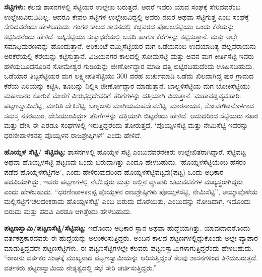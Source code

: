 \textbf{ಸೆಟ್ಟಿಗಳು:} ಕೆಲವು ಶಾಸನಗಳಲ್ಲಿ ಸೆಟ್ಟಿಯರ ಉಲ್ಲೇಖ ಬರುತ್ತದೆ. ಆದರೆ ಇವರು ಯಾವ ಸಂಘಕ್ಕೆ ಸೇರಿದವರೆಂಬ ಉಲ್ಲೇಖವಿರುವಿದಿಲ್ಲ. ಆದರೂ ಕೇವಲ ಸೆಟ್ಟಿಗಳ ಉಲ್ಲೇಖವಿದ್ದಲ್ಲಿ ಅವರು ನಖರ ಅಥವಾ ಸೆಟ್ಟಿಗುತ್ತ ಎಂಬ ಸಂಘಕ್ಕೆ ಸೇರಿದವರೆಂದು ಹೇಳಬಹುದು. ಗಂಗರ ಕಾಲದ ಶಾಸನದಲ್ಲಿ ಕಚ್ಛವರದ ಪೊೞಲಸೆಟ್ಟಿಯು ಒಂದು ಕೆರೆಯನ್ನು ಕಟ್ಟಿಸಿದನೆಂದು ಹೇಳಿದೆ. ಜಕ್ಕಿಸೆಟ್ಟಿಯು ಸುಕ್ಕುಧರೆಯಲ್ಲಿ ಬಸದಿ ಹಾಗೂ ಕೆರೆಗಳನ್ನು ಕಟ್ಟಿಸುತ್ತಾನೆ. ಮತ್ತು ಅಲ್ಲೇ ಸಮಾಧಿಮರಣವನ್ನು ಹೊಂದುತ್ತಾನೆ. ಅರಿಕುಂಟೆ ದಮ್ಮಿಸೆಟ್ಟಿಯರ ಮಗ ಒಡೆಯನಂಬಿ ಉದಯಾದಿತ್ಯ ಪಲ್ಲವರಾಯನು ಅರಕೆರೆಯಲ್ಲಿ ಕೆರೆಯನ್ನು ಕಟ್ಟಿಸುತ್ತಾನೆ. ವಿಜಯನಗರ ಕಾಲದಲ್ಲಿ ಸೋಮಸೆಟ್ಟಿ ಮತ್ತು ಅವನ ಮಗ ಕೀರ್ತಿಸೆಟ್ಟಿ ಇವರು ಹಳೆಯಬೂದನೂರಿನ ಸೋಮೇಶ್ವರ ಗುಡಿಯನ್ನು ಜೀರ್ಣೋದ್ಧಾರ ಮಾಡಿ ದತ್ತಿ ಬಿಟ್ಟಿರಬಹುದೆಂದು ಊಹಿಸಬಹುದು. ಒಡೆಯಾರ ತಿಬ್ಬಸೆಟ್ಟಿಯರ ಮಗ ಲಕ್ಷ್ಮೀಪತಿಸೆಟ್ಟಿಯು 300 ವರಹ ಖರ್ಚುಮಾಡಿ ಒಡೆದು ಖಿಲವಾಗಿದ್ದ ಪುರ ಗ್ರಾಮದ ಕೆರೆಯ ಏರಿಯನ್ನು ಕಟ್ಟಿಸಿ, ತೂಬನ್ನು ನಿಲ್ಲಿಸಿ ಜೀರ್ಣೋದ್ಧಾರ ಮಾಡುತ್ತಾನೆ. ಬಾಲ್ದಳಿಸೆಟ್ಟಿಯ ಮಗ ಬೋಕಿಸೆಟ್ಟಿಯು ಮಹಾಜನರ ಕೋರಿಕೆ ಮೇರೆಗೆ ವೀರಭದ್ರದೇವರಿಗೆ ತೆರಿಗೆಗಳನ್ನು ದತ್ತಿಯಾಗಿ ಬಿಡುತ್ತಾನೆ. ಮಹಾವಡ್ಡವ್ಯವಹಾರಿ. ಪಟ್ಟಣಸ್ವಾಮಿಸೆಟ್ಟಿ, ಮಾರಿತಿ ದೇಕಿಸೆಟ್ಟಿ, ಬಣ್ನಚಾರಿ ಮಾಗಿಯಮಹದೇವಸೆಟ್ಟಿ, ಮಾರನಾಯಕ, ಸೋವಗೌಡನೊಳಗಾದ ಸಮಸ್ತ ನಕರಮುಂ, ದೇಸಿಯುಂವಿರ್ದ್ದು ತೆರಿಗೆಗಳನ್ನು ದತ್ತಿಯಾಗಿ ಬಿಟ್ಟರೆಂದು ಹೇಳಿದೆ. ಆದುದರಿಂದ ಸೆಟ್ಟಿಯರು ನಖರ ಮತ್ತು ದೇಸಿ ಈ ಎರಡೂ ಸಂಘಗಳಲ್ಲಿ ಇರುತ್ತಿದ್ದರೆಂದು ತೋರುತ್ತದೆ. ‘ಪೊಯ್ಸಳಸೆಟ್ಟಿ ಮತ್ತು ನೇಮಿಸೆಟ್ಟಿ ಇವರನ್ನು ಧರಣೀಪಾಳಕನಪ್ಪ ಪೊಯ್ಸಳನ ರಾಜಶ್ರೇಷ್ಠಿಗಳ್​’ ಎಂದು ಹೇಳಿದೆ.

\textbf{ಹೊಯ್ಸಳ ಸೆಟ್ಟಿ/ ಸೆಟ್ಟಿವಟ್ಟ: } ಶಾಸನಗಳಲ್ಲಿ ಹೊಯ್ಸಳ ಸೆಟ್ಟಿ ಎಂಬುವವರನೇಕರು ಉಲ್ಲೇಖಿತರಾಗಿದ್ದಾರೆ. ಸೆಟ್ಟಿವಟ್ಟ ಅಥವಾ ಹೊಯ್ಸಳಸೆಟ್ಟಿ ಪಟ್ಟಣವು ಒಂದು ಬಿರುದಾಗಿತ್ತು ಎಂದೂ ಹೇಳಬಹುದು. ‘ಹೊಯ್ಸಳಸೆಟ್ಟಿಯೆಂಬ ಹೆಸರಂ ಪಡೆದ ಹೊಯ್ಸಳಸೆಟ್ಟಿಗೆಅ’, ಎಂದು ಹೇಳಿರುವುದರಿಂದ ಹೊಯ್ಸಳಸೆಟ್ಟಿವಟ್ಟವು(ಪಟ್ಟ) ಒಂದು ಅಧಿಕಾರ ಪದವಿಯಾಗಿದ್ದು, ಇವರು ಪಟ್ಟಣಗಳಲ್ಲಿ ನೆಲೆಸಿದ್ದರು ಮತ್ತು ಅಲ್ಲಿನ ವ್ಯಾಪಾರಿ ಚಟುವಟಿಕೆಗಳ ಮಖ್ಯಸ್ಥರಾಗಿದ್ದರು ಎಂದು ಹೇಳಬಹುದು. “ಧರಣೀಪಾಳಕನಪ್ಪ ಪೊಯ್ಸಳನ ರಾಜಶ್ರೇಷ್ಠಿಗಳು ಪೊಯ್ಸಳಸೆಟ್ಟಿ, ನೇಮಿಸೆಟ್ಟಿ”, ಅಯ್ಯಾವೊಳೆಯ ಮಲ್ಲಿಸೆಟ್ಟಿಗೆ\break ‘ಚಲದಂಕರಾಮ ಹೊಯ್ಸಳಸೆಟ್ಟಿ’ ಎಂಬ ಬಿರುದು ದೊರೆಯಿತು, ಎಂಬುದನ್ನು ನೋಡಿದಾಗ, ಇದೊಂದು ಬಿರುದು ಮತ್ತು ಪದವಿ ಎರಡೂ ಆಗಿತ್ತೆಂದು ಹೇಳಬಹುದು.

\textbf{ಪಟ್ಟಣಸ್ವಾಮಿ/ಪಟ್ಟಣಸೆಟ್ಟಿ/ಸೆಟ್ಟಿವಟ್ಟ: } ಇದೊಂದು ಅಧಿಕಾರ ಸ್ಥಾನ ಅಥವಾ ಹುದ್ದೆಯಾಗಿತ್ತು. ಯಾವುದಾದ\-ರೊಂದು ವರ್ತಕಪ್ರಕಾರದವರು ಈ ಹುದ್ದೆಯನ್ನು ಅಲಂಕರಿಸುತ್ತಿದ್ದರು. ಅಂದಿನ ಕಾಲದ ಪಟ್ಟಣಗಳಲ್ಲಿದ್ದುಕೊಂಡು ಅಲ್ಲೇ ವ್ಯಾಪಾರ ಮಾಡುತ್ತಿದ್ದವರೇ ಪಟ್ಟಣಸೆಟ್ಟಿಗಳು. ಈ ಪಟ್ಟಣಸೆಟ್ಟಿಗಳಲ್ಲೇ ಕೆಲವರು ಪಟ್ಟಣಸ್ವಾಮಿಗಳಾಗುತ್ತಿದ್ದರೆಂದು ಹೇಳಬಹುದು. “ರಾಜನು ವರ್ತಕರ ಸಂಘಕ್ಕೆ ಮುಖ್ಯನಾದ ಪಟ್ಟಣಸ್ವಾಮಿಯನ್ನು ಆರಿಸುತ್ತಿದ್ದಂತೆ ಕೆಲವು ಶಾಸನಗಳಿಂದ ತಿಳಿದುಬರುತ್ತದೆ. ವರ್ತಕರು ಪಟ್ಟಣಸ್ವಾಮಿಯ ನೇತೃತ್ವದಲ್ಲಿ ಸಭೆ ಸೇರಿ ಚರ್ಚಿಸುತ್ತಿದ್ದರು.”

